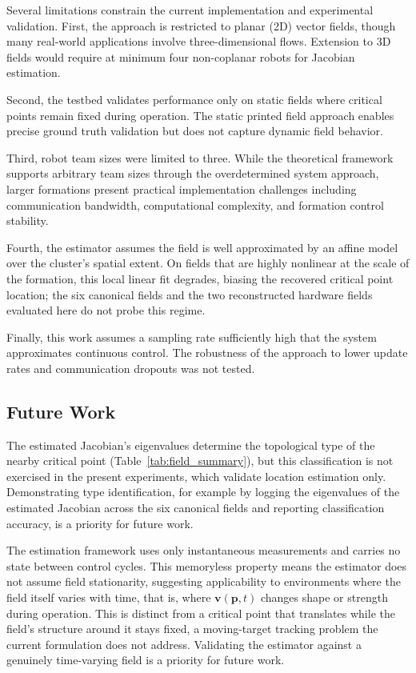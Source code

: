 \documentclass[lettersize,journal]{IEEEtran}
\begin{document}
Several limitations constrain the current implementation and experimental validation. First, the approach is restricted to planar (2D) vector fields, though many real-world applications involve three-dimensional flows. Extension to 3D fields would require at minimum four non-coplanar robots for Jacobian estimation.

Second, the testbed validates performance only on static fields where critical points remain fixed during operation. The static printed field approach enables precise ground truth validation but does not capture dynamic field behavior.

Third, robot team sizes were limited to three. While the theoretical framework supports arbitrary team sizes through the overdetermined system approach, larger formations present practical implementation challenges including communication bandwidth, computational complexity, and formation control stability.

Fourth, the estimator assumes the field is well approximated by an affine model over the cluster's spatial extent. On fields that are highly nonlinear at the scale of the formation, this local linear fit degrades, biasing the recovered critical point location; the six canonical fields and the two reconstructed hardware fields evaluated here do not probe this regime.

Finally, this work assumes a sampling rate sufficiently high that the system approximates continuous control. The robustness of the approach to lower update rates and communication dropouts was not tested.

\subsection{Future Work}

The estimated Jacobian's eigenvalues determine the topological type of the nearby critical point (Table~\ref{tab:field_summary}), but this classification is not exercised in the present experiments, which validate location estimation only. Demonstrating type identification, for example by logging the eigenvalues of the estimated Jacobian across the six canonical fields and reporting classification accuracy, is a priority for future work.

The estimation framework uses only instantaneous measurements and carries no state between control cycles. This memoryless property means the estimator does not assume field stationarity, suggesting applicability to environments where the field itself varies with time, that is, where $\mathbf{v}(\mathbf{p}, t)$ changes shape or strength during operation. This is distinct from a critical point that translates while the field's structure around it stays fixed, a moving-target tracking problem the current formulation does not address. Validating the estimator against a genuinely time-varying field is a priority for future work.
\end{document}
